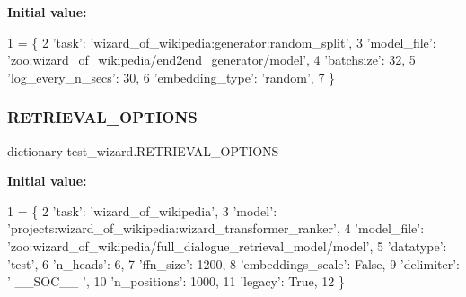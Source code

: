{\bfseries Initial value\+:}
\begin{DoxyCode}
1 =  \{
2     \textcolor{stringliteral}{'task'}: \textcolor{stringliteral}{'wizard\_of\_wikipedia:generator:random\_split'},
3     \textcolor{stringliteral}{'model\_file'}: \textcolor{stringliteral}{'zoo:wizard\_of\_wikipedia/end2end\_generator/model'},
4     \textcolor{stringliteral}{'batchsize'}: 32,
5     \textcolor{stringliteral}{'log\_every\_n\_secs'}: 30,
6     \textcolor{stringliteral}{'embedding\_type'}: \textcolor{stringliteral}{'random'},
7 \}
\end{DoxyCode}
\mbox{\label{namespacetest__wizard_a007066f16642cc2aa5f021c2d4b2e794}} 
\subsubsection{\texorpdfstring{R\+E\+T\+R\+I\+E\+V\+A\+L\+\_\+\+O\+P\+T\+I\+O\+NS}{RETRIEVAL\_OPTIONS}}
{\footnotesize\ttfamily dictionary test\+\_\+wizard.\+R\+E\+T\+R\+I\+E\+V\+A\+L\+\_\+\+O\+P\+T\+I\+O\+NS}

{\bfseries Initial value\+:}
\begin{DoxyCode}
1 =  \{
2     \textcolor{stringliteral}{'task'}: \textcolor{stringliteral}{'wizard\_of\_wikipedia'},
3     \textcolor{stringliteral}{'model'}: \textcolor{stringliteral}{'projects:wizard\_of\_wikipedia:wizard\_transformer\_ranker'},
4     \textcolor{stringliteral}{'model\_file'}: \textcolor{stringliteral}{'zoo:wizard\_of\_wikipedia/full\_dialogue\_retrieval\_model/model'},
5     \textcolor{stringliteral}{'datatype'}: \textcolor{stringliteral}{'test'},
6     \textcolor{stringliteral}{'n\_heads'}: 6,
7     \textcolor{stringliteral}{'ffn\_size'}: 1200,
8     \textcolor{stringliteral}{'embeddings\_scale'}: \textcolor{keyword}{False},
9     \textcolor{stringliteral}{'delimiter'}: \textcolor{stringliteral}{' \_\_SOC\_\_ '},
10     \textcolor{stringliteral}{'n\_positions'}: 1000,
11     \textcolor{stringliteral}{'legacy'}: \textcolor{keyword}{True},
12 \}
\end{DoxyCode}
